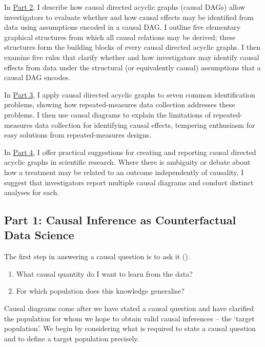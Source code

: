 \documentclass[
  single column]{article}
\providecommand{\tightlist}{%
  \setlength{\itemsep}{0pt}\setlength{\parskip}{0pt}}\usepackage{longtable,booktabs,array}
\begin{document}
In \hyperref[id-sec-2]{Part 2}, I describe how causal directed acyclic
graphs (causal DAGs) allow investigators to evaluate whether and how
causal effects may be identified from data using assumptions encoded in
a causal DAG. I outline five elementary graphical structures from which
all causal relations may be derived; these structures form the building
blocks of every causal directed acyclic graphs. I then examine five
rules that clarify whether and how investigators may identify causal
effects from data under the structural (or equivalently causal)
assumptions that a causal DAG encodes.

In \hyperref[id-sec-3]{Part 3}, I apply causal directed acyclic graphs
to seven common identification problems, showing how repeated-measures
data collection addresses these problems. I then use causal diagrams to
explain the limitations of repeated-measures data collection for
identifying causal effects, tempering enthusiasm for easy solutions from
repeated-measures designs.

In \hyperref[id-sec-4]{Part 4}, I offer practical suggestions for
creating and reporting causal directed acyclic graphs in scientific
research. Where there is ambiguity or debate about how a treatment may
be related to an outcome independently of causality, I suggest that
investigators report multiple causal diagrams and conduct distinct
analyses for each.

\subsection{Part 1: Causal Inference as Counterfactual Data
Science}\label{id-sec-1}

The first step in answering a causal question is to ask it
().

\begin{enumerate}
\def\labelenumi{\arabic{enumi}.}
\tightlist
\item
  What causal quantity do I want to learn from the data?
\item
  For which population does this knowledge generalise?
\end{enumerate}

Causal diagrams come after we have stated a causal question and have
clarified the population for whom we hope to obtain valid causal
inferences -- the `target population'. We begin by considering what is
required to state a causal question and to define a target population
precisely.
\end{document}
